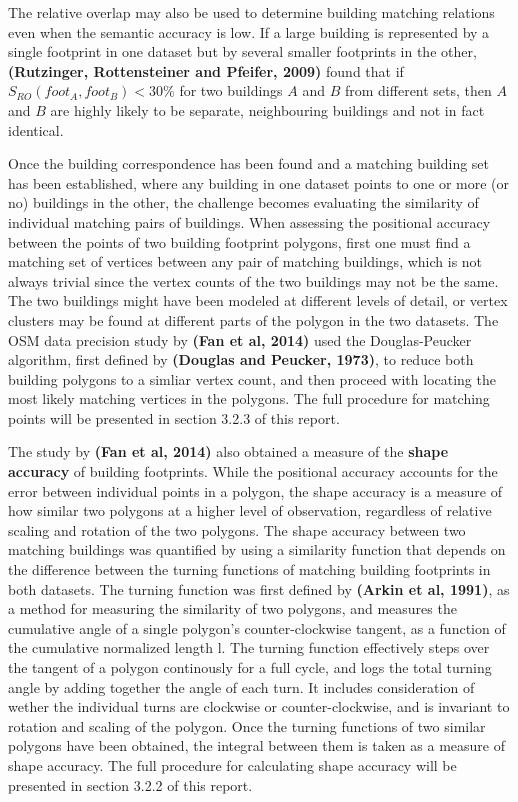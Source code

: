 \documentclass{kththesis}
\begin{document}
The relative overlap may also be used to determine building matching relations even when the semantic accuracy is low.
If a large building is represented by a single footprint in one dataset but by several smaller footprints in the other,
\textbf{(Rutzinger, Rottensteiner and Pfeifer, 2009)}
found that if $S_{RO}(foot_{A}, foot_{B}) < 30\%$ for two buildings $A$ and $B$ from different sets, then $A$ and $B$ are highly likely to be separate, neighbouring buildings and not in fact identical.

Once the building correspondence has been found and a matching building set has been established, where any building in one dataset points to one or more (or no) buildings in the other, the challenge becomes evaluating the similarity of individual matching pairs of buildings.
When assessing the positional accuracy between the points of two building footprint polygons, first one must find a matching set of vertices between any pair of matching buildings, which is not always trivial since the vertex counts of the two buildings may not be the same.
The two buildings might have been modeled at different levels of detail, or vertex clusters may be found at different parts of the polygon in the two datasets.
The OSM data precision study by \textbf{(Fan et al, 2014)} used the Douglas-Peucker algorithm, first defined by \textbf{(Douglas and Peucker, 1973)}, to reduce both building polygons to a simliar vertex count, and then proceed with locating the most likely matching vertices in the polygons.
The full procedure for matching points will be presented in section 3.2.3 of this report.

The study by \textbf{(Fan et al, 2014)} also obtained a measure of the \textbf{shape accuracy} of building footprints.
While the positional accuracy accounts for the error between individual points in a polygon, the shape accuracy is a measure of how similar two polygons at a higher level of observation, regardless of relative scaling and rotation of the two polygons.
The shape accuracy between two matching buildings was quantified by using a similarity function that depends on the difference between the turning functions of matching building footprints in both datasets.
The turning function was first defined by \textbf{(Arkin et al, 1991)}, as a method for measuring the similarity of two polygons, and measures the cumulative angle of a single polygon's counter-clockwise tangent, as a function of the cumulative normalized length l.
The turning function effectively steps over the tangent of a polygon continously for a full cycle, and logs the total turning angle by adding together the angle of each turn.
It includes consideration of wether the individual turns are clockwise or counter-clockwise, and is invariant to rotation and scaling of the polygon.
Once the turning functions of two similar polygons have been obtained, the integral between them is taken as a measure of shape accuracy.
The full procedure for calculating shape accuracy will be presented in section 3.2.2 of this report.
\end{document}

